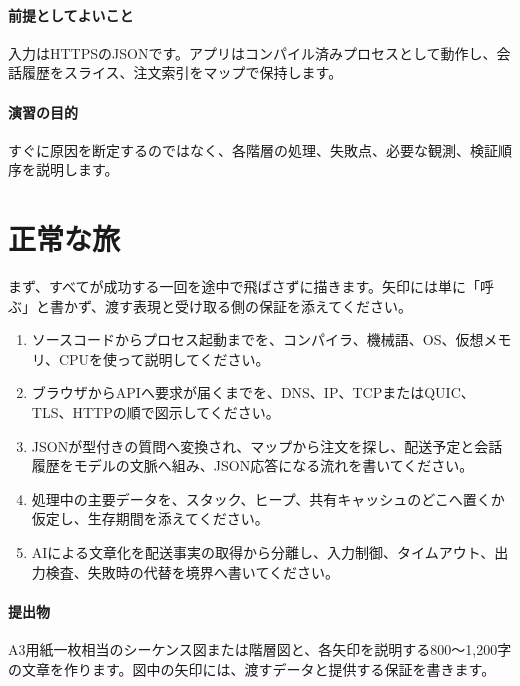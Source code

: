 \par
\endgroup
\medskip
\begingroup
\paragraph{前提としてよいこと}
        入力はHTTPSのJSONです。アプリはコンパイル済みプロセスとして動作し、会話履歴をスライス、注文索引をマップで保持します。

\paragraph{演習の目的}
        すぐに原因を断定するのではなく、各階層の処理、失敗点、必要な観測、検証順序を説明します。

\par
\endgroup
\par
\endgroup


\section{正常な旅}
\label{sec:07-practice-16}

まず、すべてが成功する一回を途中で飛ばさずに描きます。矢印には単に「呼ぶ」と書かず、渡す表現と受け取る側の保証を添えてください。

\begingroup
  \begin{enumerate}
    \setlength{\itemsep}{1mm}
    \item ソースコードからプロセス起動までを、コンパイラ、機械語、OS、仮想メモリ、CPUを使って説明してください。
    \item ブラウザからAPIへ要求が届くまでを、DNS、IP、TCPまたはQUIC、TLS、HTTPの順で図示してください。
    \item JSONが型付きの質問へ変換され、マップから注文を探し、配送予定と会話履歴をモデルの文脈へ組み、JSON応答になる流れを書いてください。
    \item 処理中の主要データを、スタック、ヒープ、共有キャッシュのどこへ置くか仮定し、生存期間を添えてください。
    \item AIによる文章化を配送事実の取得から分離し、入力制御、タイムアウト、出力検査、失敗時の代替を境界へ書いてください。
  \end{enumerate}
  \vspace{1mm}
\paragraph{提出物}
    A3用紙一枚相当のシーケンス図または階層図と、各矢印を説明する800〜1,200字の文章を作ります。図中の矢印には、渡すデータと提供する保証を書きます。

